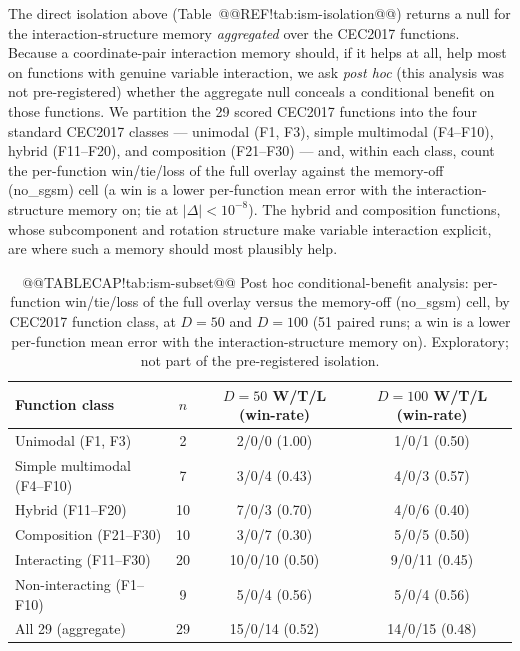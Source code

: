 \documentclass[10pt,a4paper]{article}
\begin{document}
The direct isolation above (Table~@@REF!tab:ism-isolation@@) returns a null for the
interaction-structure memory \emph{aggregated} over the CEC2017 functions.  Because a
coordinate-pair interaction memory should, if it helps at all, help most on functions
with genuine variable interaction, we ask \emph{post hoc} (this analysis was not
pre-registered) whether the aggregate null conceals a conditional benefit on those
functions.  We partition the 29 scored CEC2017 functions into the four standard
CEC2017 classes --- unimodal (F1, F3), simple multimodal
(F4--F10), hybrid (F11--F20), and composition (F21--F30) --- and, within each class,
count the per-function win/tie/loss of the full overlay against the memory-off
(no\_sgsm) cell (a win is a lower per-function mean error with the
interaction-structure memory on; tie at $|\Delta| < 10^{-8}$).  The hybrid and
composition functions, whose subcomponent and rotation structure make variable
interaction explicit, are where such a memory should most plausibly help.



\begin{table}[H]
\caption{@@TABLECAP!tab:ism-subset@@ Post hoc conditional-benefit analysis: per-function win/tie/loss of the full
overlay versus the memory-off (no\_sgsm) cell, by CEC2017 function class, at
$D=50$ and $D=100$ (51 paired runs; a win is a lower per-function mean error with the
interaction-structure memory on).  Exploratory; not part of the pre-registered
isolation.}\label{tab:ism-subset}
\footnotesize
\begin{tabular}{lccc}
\toprule
\textbf{Function class} & \textbf{$n$} & \textbf{$D{=}50$ W/T/L (win-rate)} & \textbf{$D{=}100$ W/T/L (win-rate)}\\
\midrule
Unimodal (F1, F3)            & 2  & 2/0/0 (1.00) & 1/0/1 (0.50)\\
Simple multimodal (F4--F10)  & 7  & 3/0/4 (0.43) & 4/0/3 (0.57)\\
Hybrid (F11--F20)            & 10 & 7/0/3 (0.70) & 4/0/6 (0.40)\\
Composition (F21--F30)       & 10 & 3/0/7 (0.30) & 5/0/5 (0.50)\\
\midrule
Interacting (F11--F30)       & 20 & 10/0/10 (0.50) & 9/0/11 (0.45)\\
Non-interacting (F1--F10)    & 9  & 5/0/4 (0.56) & 5/0/4 (0.56)\\
All 29 (aggregate)           & 29 & 15/0/14 (0.52) & 14/0/15 (0.48)\\
\bottomrule
\end{tabular}
\end{table}
\end{document}
